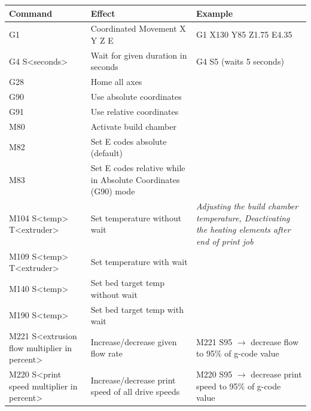 \begin{table}[H]
  \centering
  \begin{tabulary}{\textwidth}{ L L L }  
    \toprule
    Command   
      & Effect  
        & Example     \\
    \midrule
    G1  
      & Coordinated Movement X Y Z E  
        & G1 X130 Y85 Z1.75 E4.35     \\
    G4 S<seconds>   
      & Wait for given duration in seconds  
        & G4 S5 (waits 5 seconds)  \\
    G28   
      & Home all axes 
        &        \\
    G90   
      & Use absolute coordinates 
        &       \\
    G91   
      & Use relative coordinates 
        &       \\
    M80  
      & Activate build chamber  
        &      \\
    M82   
      & Set E codes absolute (default)
        &       \\ 
    M83   
      & Set E codes relative while in Absolute Coordinates (G90) mode
        &         \\
    M104 S<temp> T<extruder>  
      & Set temperature without wait  
        & \emph{Adjusting the build chamber temperature,
               Deactivating the heating elements after end of print job}     \\
    M109 S<temp> T<extruder>  
      & Set temperature with wait  
        &       \\
    M140 S<temp>  
      & Set bed target temp without wait 
        &       \\
    M190 S<temp>  
      & Set bed target temp with wait   
        &      \\
    M221 S<extrusion flow multiplier in percent>  
      & Increase/decrease given flow rate   
        & M221 S95     
          $\rightarrow$ decrease flow to 95\% of g-code value     \\
    M220 S<print speed multiplier in percent>   
      & Increase/decrease print speed of all drive speeds   
        & M220 S95     
          $\rightarrow$ decrease print speed to 95\% of g-code value      \\
    \bottomrule
  \end{tabulary}
\end{table}